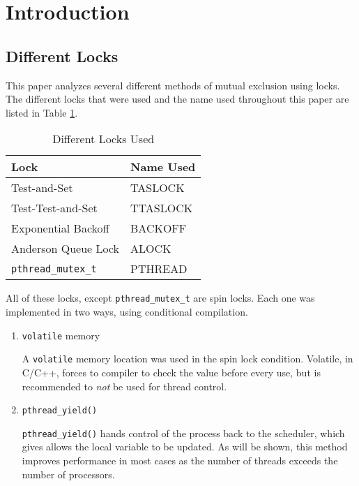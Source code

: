 \section{Introduction}

\subsection{Different Locks}

This paper analyzes several different methods of mutual exclusion using locks.
The different locks that were used and the name used throughout this paper are listed in Table \ref{table:locks}.

\begin{table}[hp]
    \caption{Different Locks Used}
    \begin{center}
        \begin{tabular}{|l|l|}
            \hline Lock & Name Used \\
            \hline Test-and-Set & TASLOCK \\
            \hline Test-Test-and-Set & TTASLOCK \\
            \hline Exponential Backoff & BACKOFF \\
            \hline Anderson Queue Lock & ALOCK \\
            \hline \verb+pthread_mutex_t+ & PTHREAD \\
            \hline
        \end{tabular}
    \end{center}
    \label{table:locks}
\end{table}

All of these locks, except \verb+pthread_mutex_t+ are spin locks.
Each one was implemented in two ways, using conditional compilation.
\begin{enumerate}
    \item \verb+volatile+ memory

        A \verb+volatile+ memory location was used in the spin lock condition.
        Volatile, in C/C++, forces to compiler to check the value before every use, but is recommended to \emph{not} be used for thread control.
    \item \verb+pthread_yield()+

        \verb+pthread_yield()+ hands control of the process back to the scheduler, which gives allows the local variable to be updated.
        As will be shown, this method improves performance in most cases as the number of threads exceeds the number of processors.
\end{enumerate}


